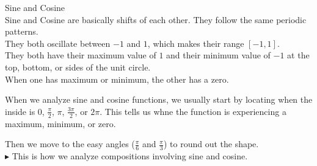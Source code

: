 \documentclass{ximera}
\begin{document}
\begin{summary} Sine and Cosine \\


Sine and Cosine are basically shifts of each other.  They follow the same periodic patterns. \\

They both oscillate between $-1$ and $1$, which makes their range $[-1,1]$. \\

They both have their maximum value of $1$ and their minimum value of $-1$ at the top, bottom, or sides of the unit circle. \\

When one has maximum or minimum, the other has a zero. \\

\end{summary}


When we analyze sine and cosine functions, we usually start by locating when the inside is $0$, $\frac{\pi}{2}$, $\pi$, $\frac{3\pi}{2}$, or $2\pi$.  This tells us whne the function is experiencing a maximum, minimum, or zero.

Then we move to the easy angles ($\frac{\pi}{6}$ and $\frac{\pi}{3}$) to round out the shape. \\





\textbf{\textcolor{red!80!black}{$\blacktriangleright$}} This is how we analyze compositions involving sine and cosine.
\end{document}
